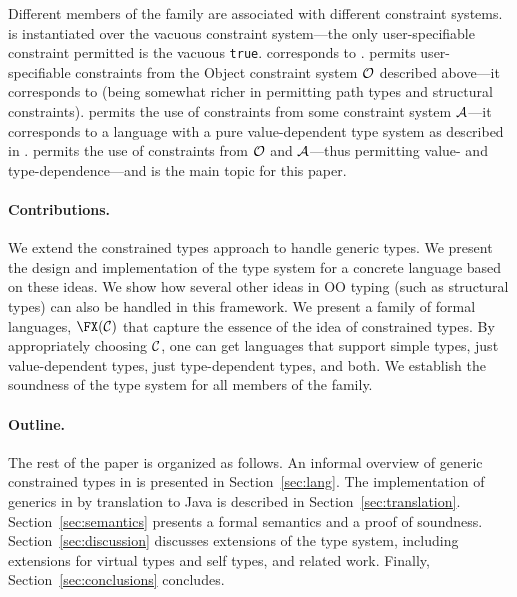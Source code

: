 Different members of the family are associated with different
constraint systems. \FXZ{} is
\FX{} instantiated over the vacuous constraint system---the only
user-specifiable constraint permitted is the vacuous {\tt true}. \FXZ{}
corresponds to \FJ. \FXG{} permits user-specifiable constraints from the 
Object constraint system $\cal O$ described above---it corresponds to
\FGJ{} (being somewhat richer in permitting path types and
structural constraints). \FXD{} permits
the use of constraints from some constraint system $\cal A$---it
corresponds to a language with a pure value-dependent type system as
described in \cite{constrained-types}. \FXGD{} permits the use of constraints
from $\cal O$ and $\cal A$---thus permitting value- and
type-dependence---and is the main topic for this paper.


\paragraph{Contributions.}
We extend the constrained types approach to handle generic types.  We
present the design and implementation of the type system for a
concrete language \Xten{} based on these ideas. We show how several
other ideas in OO typing (such as structural types) can also be
handled in this framework. We present a family of formal languages,
$\FX(\cal C)$ that capture the essence of the idea of constrained
types. By appropriately choosing $\cal C$, one can get languages that
support simple types, just value-dependent types, just type-dependent
types, and both. We establish the soundness of the type system for all
members of the family.

\paragraph{Outline.}

The rest of the paper is organized as follows.
%
An informal overview of generic constrained types in \Xten{}
is presented in
Section~\ref{sec:lang}.  The implementation of generics in \Xten{} by translation to Java is described in 
Section~\ref{sec:translation}.
%
Section~\ref{sec:semantics} presents a formal semantics and a
proof of soundness.
%
Section~\ref{sec:discussion} discusses extensions of the type system,
including extensions for virtual types and self types, and related work.
%
Finally, Section~\ref{sec:conclusions} concludes.


